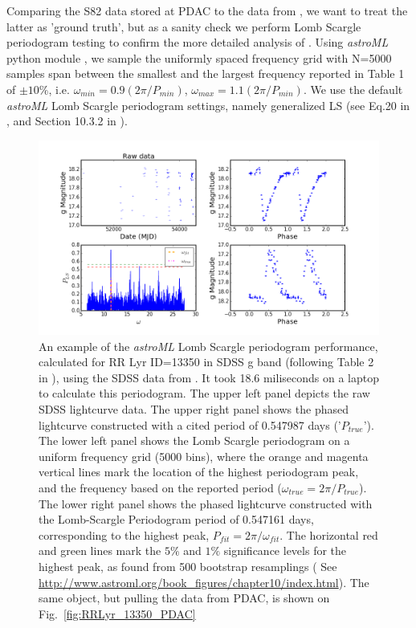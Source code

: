 \documentclass[fleqn,usenatbib]{mnras} %
\begin{document}
Comparing the S82 data stored at PDAC to the data from \cite{sesar2010},  we want to treat the latter as 'ground truth', but as a sanity check we perform Lomb Scargle periodogram testing to confirm the more detailed analysis of \cite{sesar2010}. Using {\it astroML} python module \citep{astroML}, we sample the uniformly spaced frequency grid with N=5000 samples span between the smallest and the largest frequency reported in Table 1 of \cite{sesar2010} $\pm 10\%$, i.e. $\omega_{min} = 0.9 ( 2 \pi / P_{min})$, $\omega_{max} = 1.1 ( 2 \pi / P_{min})$. We use the default {\it astroML} Lomb Scargle periodogram settings, namely generalized LS (see Eq.20 in \cite{zechmeister2009}, and Section 10.3.2 in \cite{ivezic2014}).   



\begin{figure}
\includegraphics[width=\textwidth]{figs/Fig_2_RRLyr_LS_periodogram_ID_13350_g}
\caption{ An example of the  {\it astroML} Lomb Scargle periodogram performance,  calculated for RR Lyr ID=13350  in SDSS g band (following Table 2 in \citep{sesar2010}), using the SDSS data from \citep{sesar2010}.  It took 18.6 miliseconds on a laptop to calculate this periodogram. The upper left panel depicts the raw  SDSS lightcurve data. The upper right panel shows the phased lightcurve constructed with a cited period of 0.547987 days ('$P_{true}$'). The lower left panel shows the Lomb Scargle periodogram on  a uniform frequency grid (5000 bins), where the orange and magenta vertical lines mark the location of the highest periodogram peak, and the frequency based on the reported period ($\omega_{true} = 2 \pi / P_{true}$). The lower right panel shows the phased lightcurve constructed with the Lomb-Scargle Periodogram period of 0.547161 days,  corresponding to the highest peak, $P_{fit} = 2 \pi / \omega_{fit}$. The horizontal red and green lines mark the $5\%$ and $1\%$  significance levels for the highest peak, as found from 500 bootstrap resamplings ( See \url{http://www.astroml.org/book\_figures/chapter10/index.html}). The same object, but pulling the data from PDAC, is shown on Fig.~\ref{fig:RRLyr_13350_PDAC} }
\label{fig:RRLyr_13350_Sesar}
\end{figure}
\end{document}
